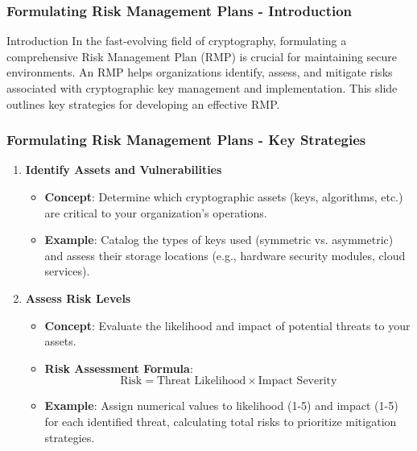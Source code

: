 \documentclass{beamer}
\begin{document}
\begin{frame}[fragile]
    \frametitle{Formulating Risk Management Plans - Introduction}
    \begin{block}{Introduction}
        In the fast-evolving field of cryptography, formulating a comprehensive Risk Management Plan (RMP) is crucial for maintaining secure environments. An RMP helps organizations identify, assess, and mitigate risks associated with cryptographic key management and implementation. This slide outlines key strategies for developing an effective RMP.
    \end{block}
\end{frame}

\begin{frame}[fragile]
    \frametitle{Formulating Risk Management Plans - Key Strategies}
    \begin{enumerate}
        \item \textbf{Identify Assets and Vulnerabilities}
        \begin{itemize}
            \item \textbf{Concept}: Determine which cryptographic assets (keys, algorithms, etc.) are critical to your organization's operations.
            \item \textbf{Example}: Catalog the types of keys used (symmetric vs. asymmetric) and assess their storage locations (e.g., hardware security modules, cloud services).
        \end{itemize}
        
        \item \textbf{Assess Risk Levels}
        \begin{itemize}
            \item \textbf{Concept}: Evaluate the likelihood and impact of potential threats to your assets.
            \item \textbf{Risk Assessment Formula}:
            \begin{equation}
                \text{Risk} = \text{Threat Likelihood} \times \text{Impact Severity}
            \end{equation}
            \item \textbf{Example}: Assign numerical values to likelihood (1-5) and impact (1-5) for each identified threat, calculating total risks to prioritize mitigation strategies.
        \end{itemize}
    \end{enumerate}
\end{frame}
\end{document}
